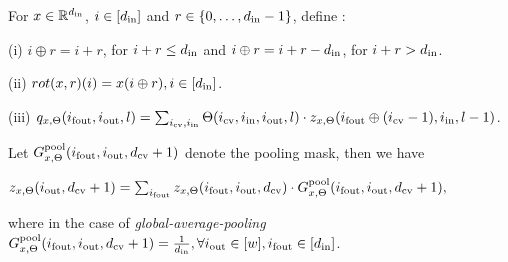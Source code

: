 \begin{definition}
For $x\in\mathbb{R}^{d_{\text{in}}}$, $i\in[d_{\text{in}}]$ and $r\in\{0,\ldots,d_{\text{in}}-1\}$, define :

(i) $i\oplus r = i+r$, for $i+r \leq d_{\text{in}}$ and $i\oplus r =i+r-d_{\text{in}}$, for $i+r>d_{\text{in}}$.

(ii) $rot(x,r)(i)=x(i\oplus r), i\in[d_{\text{in}}]$.

(iii) $q_{x,\Theta}(i_{\text{fout}},i_{\text{out}},l)=\sum_{i_{\text{cv}},i_{\text{in}}}\Theta(i_{\text{cv}},i_{\text{in}},i_{\text{out}},l)\cdot z_{x,\Theta}(i_{\text{fout}}\oplus (i_{\text{cv}}-1),i_{\text{in}},l-1)$. 
\end{definition}
\begin{definition}[Pooling]\label{def:pooling}
Let $G^{\text{pool}}_{x,\Theta}(i_{\text{fout}},i_{\text{out}},d_{\text{cv}}+1)$ denote the pooling mask, then we have
\centerline{
$z_{x,\Theta}(i_{\text{out}}, d_{\text{cv}}+1) =\sum_{i_{\text{fout}}} z_{x,\Theta}(i_{\text{fout}},i_{\text{out}},d_{\text{cv}})\cdot G^{\text{pool}}_{x,\Theta}(i_{\text{fout}},i_{\text{out}},d_{\text{cv}}+1),$
}
where in the case of \emph{global-average-pooling} $G^{\text{pool}}_{x,\Theta}(i_{\text{fout}},i_{\text{out}},d_{\text{cv}}+1)=\frac{1}{d_{\text{in}}},\forall i_{\text{out}}\in[w], i_{\text{fout}}\in[d_{\text{in}}]$.
\end{definition}
\FloatBarrier
